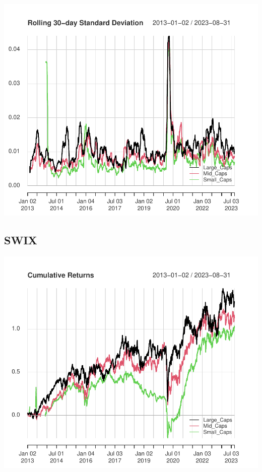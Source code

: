 \documentclass[11pt,preprint, authoryear]{elsarticle}
\numberwithin{equation}{section}
\numberwithin{figure}{section}
\numberwithin{table}{section}
\begin{document}
\includegraphics{Question-3_files/figure-latex/unnamed-chunk-2-1.pdf}

\hypertarget{swix}{%
\subsection{SWIX}\label{swix}}

\includegraphics{Question-3_files/figure-latex/unnamed-chunk-3-1.pdf}
\end{document}
